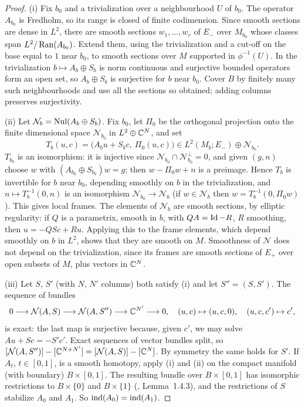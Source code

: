 \begin{proof}
  (i) Fix $b_0$ and a trivialization over a neighbourhood $U$ of $b_0$. The
  operator $A_{b_0}$ is Fredholm, so its range is closed of finite codimension.
  Since smooth sections are dense in $L^2$, there are smooth sections
  $w_1,\dots,w_r$ of $E_-$ over $M_{b_0}$ whose classes span
  $L^2/\operatorname{Ran}(A_{b_0})$. Extend them, using the trivialization and a cut-off on
  the base equal to $1$ near $b_0$, to smooth sections over $M$ supported in
  $\phi^{-1}(U)$. In the trivialization $b\mapsto A_b\oplus S_b$ is norm
  continuous and surjective bounded operators form an open set, so
  $A_b\oplus S_b$ is surjective for $b$ near $b_0$. Cover $B$ by finitely many
  such neighbourhoods and use all the sections so obtained; adding columns
  preserves surjectivity.

  (ii) Let $\mathcal N_b=\operatorname{Nul}(A_b\oplus S_b)$. Fix $b_0$, let $\Pi_0$ be the
  orthogonal projection onto the finite dimensional space $\mathcal N_{b_0}$ in
  $L^2\oplus\mathbb{C}^N$, and set
  \begin{equation*}
    T_b(u,c)=\bigl(A_bu+S_bc,\ \Pi_0(u,c)\bigr)\in L^2(M_b;E_-)\oplus
    \mathcal N_{b_0}.
  \end{equation*}
  $T_{b_0}$ is an isomorphism: it is injective since $\mathcal N_{b_0}\cap
  \mathcal N_{b_0}^\perp=0$, and given $(g,n)$ choose $w$ with $(A_{b_0}\oplus
  S_{b_0})w=g$; then $w-\Pi_0w+n$ is a preimage. Hence $T_b$ is invertible for
  $b$ near $b_0$, depending smoothly on $b$ in the trivialization, and
  $n\mapsto T_b^{-1}(0,n)$ is an isomorphism $\mathcal N_{b_0}\to\mathcal N_b$
  (if $w\in\mathcal N_b$ then $w=T_b^{-1}(0,\Pi_0w)$). This gives local frames.
  The elements of $\mathcal N_b$ are smooth sections, by elliptic regularity:
  if $Q$ is a parametrix, smooth in $b$, with $QA=\operatorname{Id}-R$, $R$ smoothing, then
  $u=-QS c+Ru$. Applying this to the frame elements, which depend smoothly on
  $b$ in $L^2$, shows that they are smooth on $M$. Smoothness of
  $\mathcal N$ does not depend on the trivialization, since its frames are
  smooth sections of $E_+$ over open subsets of $M$, plus vectors in $\mathbb{C}^N$.

  (iii) Let $S$, $S'$ (with $N$, $N'$ columns) both satisfy (i) and let
  $S''=(S,S')$. The sequence of bundles
  \begin{equation*}
    0\longrightarrow\mathcal N(A,S)\longrightarrow\mathcal N(A,S'')
    \longrightarrow\mathbb{C}^{N'}\longrightarrow0,\quad
    (u,c)\mapsto(u,c,0),\quad(u,c,c')\mapsto c',
  \end{equation*}
  is exact: the last map is surjective because, given $c'$, we may solve
  $Au+Sc=-S'c'$. Exact sequences of vector bundles split, so
  $[\mathcal N(A,S'')]-[\mathbb{C}^{N+N'}]=[\mathcal N(A,S)]-[\mathbb{C}^N]$. By symmetry the
  same holds for $S'$. If $A_t$, $t\in[0,1]$, is a smooth homotopy, apply (i)
  and (ii) on the compact manifold (with boundary) $B\times[0,1]$. The
  resulting bundle over $B\times[0,1]$ has isomorphic restrictions to
  $B\times\{0\}$ and $B\times\{1\}$ (\cite{Atiyah-K}, Lemma~1.4.3), and the
  restrictions of $S$ stabilize $A_0$ and $A_1$. So $\operatorname{ind}(A_0)=\operatorname{ind}(A_1)$.


\end{proof}
